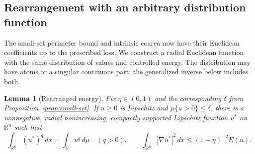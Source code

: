 \documentclass[11pt]{article}
\numberwithin{equation}{section}
\newtheorem{lemma}[theorem]{Lemma}
\theoremstyle{definition}
\theoremstyle{remark}
\begin{document}
\subsection{Rearrangement with an arbitrary distribution function}

The small-set perimeter bound and intrinsic coarea now have their
Euclidean coefficients up to the prescribed loss. We construct a radial
Euclidean function with the same distribution of values and controlled
energy. The distribution may have atoms or a singular continuous part;
the generalized inverse below includes both.

\begin{lemma}[Rearranged energy]
\label{lem:rearranged-energy}
Fix $\eta\in(0,1)$ and the corresponding $\delta$ from
Proposition~\ref{prop:small-set}.  If $u\ge0$ is Lipschitz and
$\mu\{u>0\}\le\delta$, there is a nonnegative, radial nonincreasing,
compactly supported Lipschitz function $u^*$ on $\mathbb R^n$ such that
\begin{equation}
 \int_{\mathbb R^n}(u^*)^q\,d x=\int_Yu^q\,d\mu\quad(q>0),
 \qquad
 \int_{\mathbb R^n}|\nabla u^*|^2\,d x
       \le(1-\eta)^{-2}E(u).
 \label{eq:rearranged-energy-bound}
\end{equation}
\end{lemma}
\end{document}
